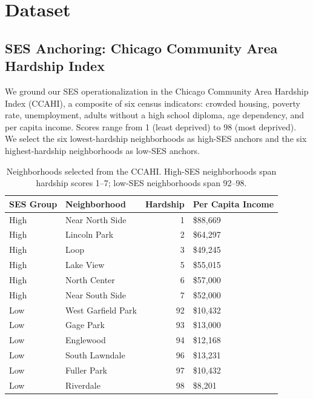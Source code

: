 \documentclass{article}
\begin{document}
\section{Dataset}
\label{sec:dataset}

\subsection{SES Anchoring: Chicago Community Area Hardship Index}

We ground our SES operationalization in the Chicago Community Area Hardship
Index (CCAHI), a composite of six census indicators: crowded housing, poverty
rate, unemployment, adults without a high school diploma, age dependency, and
per capita income.
Scores range from 1 (least deprived) to 98 (most deprived).
We select the six lowest-hardship neighborhoods as high-SES anchors and the
six highest-hardship neighborhoods as low-SES anchors.

\begin{table}[h]
\centering
\caption{Neighborhoods selected from the CCAHI.
High-SES neighborhoods span hardship scores 1--7;
low-SES neighborhoods span 92--98.}
\label{tab:neighborhoods}
\small
\begin{tabular}{llrl}
\toprule
\textbf{SES Group} & \textbf{Neighborhood} & \textbf{Hardship} &
\textbf{Per Capita Income}\\
\midrule
High & Near North Side    &  1 & \$88,669\\
High & Lincoln Park       &  2 & \$64,297\\
High & Loop               &  3 & \$49,245\\
High & Lake View          &  5 & \$55,015\\
High & North Center       &  6 & \$57,000\\
High & Near South Side    &  7 & \$52,000\\
\midrule
Low  & West Garfield Park & 92 & \$10,432\\
Low  & Gage Park          & 93 & \$13,000\\
Low  & Englewood          & 94 & \$12,168\\
Low  & South Lawndale     & 96 & \$13,231\\
Low  & Fuller Park        & 97 & \$10,432\\
Low  & Riverdale          & 98 & \$8,201\\
\bottomrule
\end{tabular}
\end{table}
\end{document}

